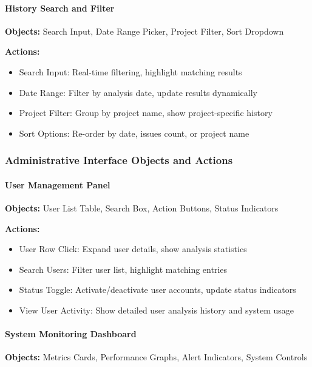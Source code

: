 \documentclass[12pt,a4paper]{article}
\begin{document}
    \paragraph{History Search and Filter}
    \textbf{Objects:} Search Input, Date Range Picker, Project Filter, Sort Dropdown

    \textbf{Actions:}
    \begin{itemize}[leftmargin=0.5in]
        \item Search Input: Real-time filtering, highlight matching results
        \item Date Range: Filter by analysis date, update results dynamically
        \item Project Filter: Group by project name, show project-specific history
        \item Sort Options: Re-order by date, issues count, or project name
    \end{itemize}

    \subsubsection{Administrative Interface Objects and Actions}

    \paragraph{User Management Panel}
    \textbf{Objects:} User List Table, Search Box, Action Buttons, Status Indicators

    \textbf{Actions:}
    \begin{itemize}[leftmargin=0.5in]
        \item User Row Click: Expand user details, show analysis statistics
        \item Search Users: Filter user list, highlight matching entries
        \item Status Toggle: Activate/deactivate user accounts, update status indicators
        \item View User Activity: Show detailed user analysis history and system usage
    \end{itemize}

    \paragraph{System Monitoring Dashboard}
    \textbf{Objects:} Metrics Cards, Performance Graphs, Alert Indicators, System Controls
\end{document}
